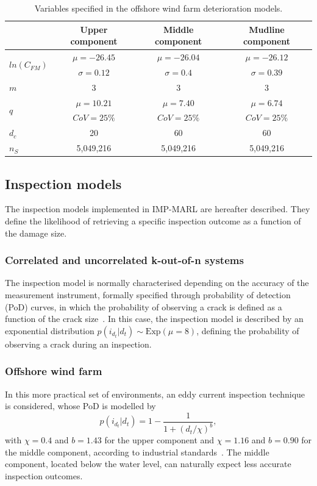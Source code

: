 \begin{table}
\centering
\begin{tabular}{lccc}
\toprule
 & Upper component & Middle component & Mudline component  \\
 \midrule
\multirow{2}{*}{$ln(C_{FM})$} & $\mu=-26.45$ & $\mu=-26.04$ & $\mu=-26.12$ \\
& $\sigma=0.12$ & $\sigma=0.4$ &  $\sigma=0.39$ \\
$m$ & 3 & 3 & 3 \\
\multirow{2}{*}{$q$}   & $\mu=10.21$  & $\mu=7.40$ & $\mu=6.74$  \\
 & $CoV=25\% $  & $CoV=25\% $ & $CoV=25\% $  \\
$d_c$ & 20 & 60 & 60 \\
$n_{S}$ & 5,049,216 & 5,049,216 & 5,049,216
\\
\bottomrule
\end{tabular}
\caption{Variables specified in the offshore wind farm deterioration models.}
\label{tab:owf_fatigue}
\end{table}

\subsection{Inspection models}
The inspection models implemented in IMP-MARL are hereafter described. 
They define the likelihood of retrieving a specific inspection outcome as a function of the damage size.

\subsubsection{Correlated and uncorrelated k-out-of-n systems}
The inspection model is normally characterised depending on the accuracy of the measurement instrument, formally specified through probability of detection (PoD) curves, in which the probability of observing a crack is defined as a function of the crack size~\citep{morato2022optimal}.
In this case, the inspection model is described by an exponential distribution $p({i_{d_t}}|d_t) \sim \text{Exp}(\mu = 8)$, defining the probability of observing a crack during an inspection.

\subsubsection{Offshore wind farm}
In this more practical set of environments, an eddy current inspection technique is considered, whose PoD is modelled by
\begin{equation} \label{eq:ex_pod1}
    p({i_{d_t}}|d_t) = 1 - \frac{1}{1+(d_t/\chi)^b}, 
\end{equation}
with $\chi=0.4$ and $b=1.43$ for the upper component and $\chi=1.16$ and $b=0.90$ for the middle component, according to industrial standards~\citep{dnv2015probabilistic}.
The middle component, located below the water level, can naturally expect less accurate inspection outcomes.

